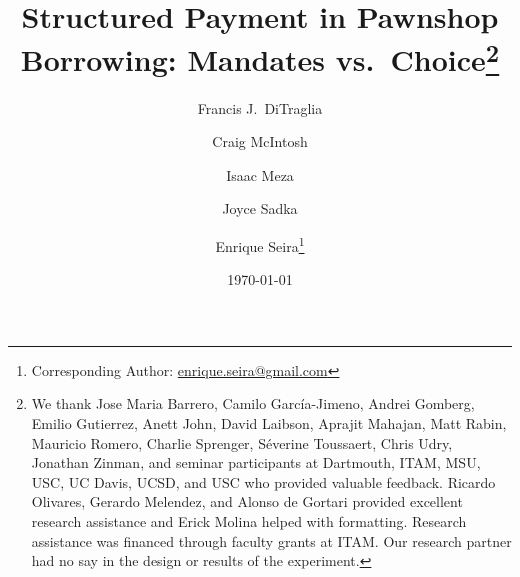 \documentclass[12pt, a4paper, colorinlistoftodos]{article}
\begin{document}
\listoftodos

\title{Structured Payment in Pawnshop Borrowing: Mandates vs.\ Choice\thanks{We thank Jose Maria Barrero, Camilo García-Jimeno, Andrei Gomberg, Emilio Gutierrez, Anett John, David Laibson, Aprajit Mahajan, Matt Rabin, Mauricio Romero, Charlie Sprenger, Séverine Toussaert, Chris Udry, Jonathan Zinman, and seminar participants at Dartmouth, ITAM, MSU, USC, UC Davis, UCSD, and USC who provided valuable feedback. Ricardo Olivares, Gerardo Melendez, and Alonso de Gortari provided excellent research assistance and Erick Molina helped with formatting.  Research assistance was financed through faculty grants at ITAM. Our research partner had no say in the design or results of the experiment.}}
\author[1]{Francis J.\ DiTraglia}
\author[2]{Craig McIntosh}
\author[3]{Isaac Meza}
\author[4]{Joyce Sadka}
\author[5]{Enrique Seira\thanks{Corresponding Author: \href{mailto:enrique.seira@gmail.com}{enrique.seira@gmail.com}}}


\date{\today \\[2 cm]}




\maketitle
\vspace{-0.75in}
\end{document}
